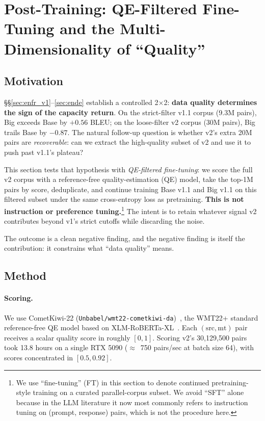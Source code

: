 \section{Post-Training: QE-Filtered Fine-Tuning and the Multi-Dimensionality of ``Quality''}
\label{sec:sft}

\subsection{Motivation}
\S\S\ref{sec:enfr_v1}--\ref{sec:ende} establish a controlled 2$\times$2: \textbf{data quality determines the sign of the capacity return}. On the strict-filter v1.1 corpus (9.3M pairs), Big exceeds Base by $+0.56$ BLEU; on the loose-filter v2 corpus (30M pairs), Big trails Base by $-0.87$. The natural follow-up question is whether v2's extra 20M pairs are \emph{recoverable}: can we extract the high-quality subset of v2 and use it to push past v1.1's plateau?

This section tests that hypothesis with \emph{QE-filtered fine-tuning}: we score the full v2 corpus with a reference-free quality-estimation (QE) model, take the top-1M pairs by score, deduplicate, and continue training Base v1.1 and Big v1.1 on this filtered subset under the same cross-entropy loss as pretraining. \textbf{This is not instruction or preference tuning.}\footnote{We use ``fine-tuning'' (FT) in this section to denote continued pretraining-style training on a curated parallel-corpus subset. We avoid ``SFT'' alone because in the LLM literature it now most commonly refers to instruction tuning on (prompt, response) pairs, which is not the procedure here.} The intent is to retain whatever signal v2 contributes beyond v1's strict cutoffs while discarding the noise.

The outcome is a clean negative finding, and the negative finding is itself the contribution: it constrains what ``data quality'' means.

\subsection{Method}
\paragraph{Scoring.} We use CometKiwi-22 (\texttt{Unbabel/wmt22-cometkiwi-da})~\cite{rei2022cometkiwi}, the WMT22+ standard reference-free QE model based on XLM-RoBERTa-XL~\cite{conneau2020unsupervised}. Each $(\text{src}, \text{mt})$ pair receives a scalar quality score in roughly $[0, 1]$. Scoring v2's 30{,}129{,}500 pairs took 13.8 hours on a single RTX 5090 ($\approx$~750 pairs/sec at batch size 64), with scores concentrated in $[0.5, 0.92]$.

